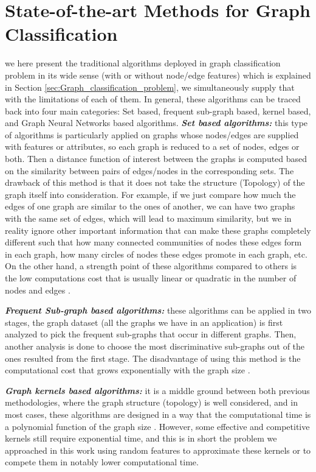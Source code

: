 \section{State-of-the-art Methods for Graph Classification}
we here present the traditional algorithms deployed in graph classification problem in its wide sense (with or without node/edge features) which is explained in Section \ref{sec:Graph_classification_problem}, we simultaneously supply that with the limitations of each of them. In general, these algorithms can be traced back into four main categories: Set based, frequent sub-graph based, kernel based, and Graph Neural Networks based algorithms.\newline 
\textbf{\emph{Set based algorithms:}} this type of algorithms is particularly applied on graphs whose nodes/edges are supplied with features or attributes, so each graph is reduced to  a set of nodes, edges or both. Then a distance function of interest between the graphs is computed  based on the similarity between pairs of edges/nodes in the corresponding sets. The drawback of this method is that it does not take the structure (Topology) of the graph itself into consideration. For example, if we just compare how much the edges of one graph are similar to the ones of another, we can have two graphs with the same set of edges, which will lead to maximum similarity, but we in reality ignore other important information that can make these graphs completely different such that how many connected communities of nodes these edges form in each graph, how many circles of nodes these edges promote in each graph, etc. On the other hand, a strength point of these algorithms  compared to others is the low computations cost that is usually linear or quadratic in the number of nodes and edges \citep{graphlet_kernel}.

\textbf{\emph{Frequent Sub-graph based algorithms:}} these algorithms can be applied in two stages, the graph dataset (all the graphs we have  in an application) is first analyzed to pick the frequent sub-graphs that occur in different graphs. Then, another analysis is done to choose the most discriminative sub-graphs out of the ones resulted from the first stage. The disadvantage of using this method is the computational cost that grows exponentially with the graph size \citep{graphlet_kernel}. \newline

\textbf{\emph{Graph kernels based algorithms:}} it is a middle ground between both previous methodologies, where the graph structure (topology) is well considered, and in most cases, these algorithms are designed in a way that the computational time is a polynomial function of the graph size \citep{graphlet_kernel}. However, some effective and competitive kernels still require exponential time, and this is in short the problem we approached in this work using random features to approximate these kernels or to compete them in notably lower computational time. \newline

